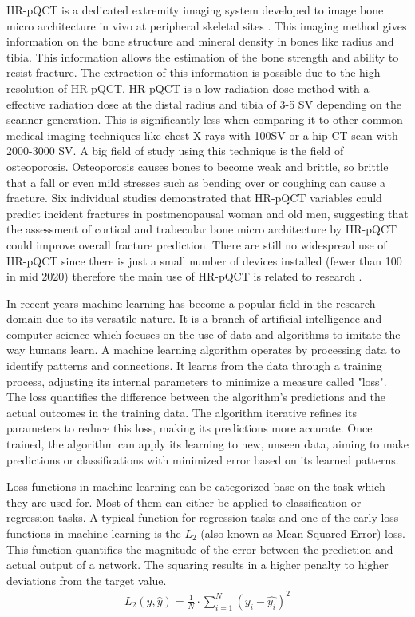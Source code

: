 \documentclass[
a4paper, 
12pt,
grayscalebody, %
abstract=on,
twoside, BCOR10mm, 12pt, DIV13,headinclude, footexclude, final, abstracton, openright
]{ibireprt}
\numberwithin{equation}{chapter}
\numberwithin{table}{chapter}
\numberwithin{figure}{chapter}
\numberwithin{algorithm}{chapter}
\numberwithin{example}{chapter}
\numberwithin{example}{chapter}
\begin{document}
HR-pQCT is a  dedicated extremity imaging system developed to image bone micro architecture in vivo at peripheral skeletal sites \cite{Bergh2021}. This imaging method gives information on the bone structure and mineral density in bones like radius and tibia. This information allows the estimation of the bone strength and ability to resist fracture. The extraction of this information is possible due to the high resolution of HR-pQCT.%
 HR-pQCT is a low radiation dose method with a effective radiation dose at the distal radius and tibia of  3-5 \textmu SV depending on the scanner  generation. This is significantly less when comparing it to other common medical imaging techniques like chest X-rays with 100\textmu SV or a hip CT scan with 2000-3000 \textmu SV. A big field of study using this technique is the field of osteoporosis. Osteoporosis causes bones to become weak and brittle, so brittle that a fall or even mild stresses such as bending over or coughing can cause a fracture. Six individual studies demonstrated that HR-pQCT variables could predict incident fractures in postmenopausal woman and old men, suggesting that the assessment of cortical and trabecular bone micro architecture by HR-pQCT could improve overall fracture prediction. There are still no widespread use of HR-pQCT since there is just a small number of devices installed (fewer than 100 in mid 2020) therefore the main use of HR-pQCT is related to research \cite{Bergh2021}.


In recent years machine learning has become a popular field in the research domain due to its versatile nature. It is a branch of artificial intelligence and computer science which focuses on the use of data and algorithms to imitate the way humans learn. A machine learning algorithm operates by processing data to identify patterns and connections. It learns from the data through a training process, adjusting its internal parameters to minimize a measure called "loss". The loss quantifies the difference between the algorithm's predictions and the actual outcomes in the training data. The algorithm iterative refines its parameters to reduce this loss, making its predictions more accurate. Once trained, the algorithm can apply its learning to new, unseen data, aiming to make predictions or classifications with minimized error based on its learned patterns.

Loss functions in machine learning can be categorized base on the task which they are used for. Most of them can either be applied to classification or regression tasks. A typical function for regression tasks and one of the early loss functions in machine learning is the $L_2$ (also known as Mean Squared Error) loss. This function quantifies the magnitude of the error between the prediction and actual output of a network. The squaring results in a higher penalty to higher deviations from the target value. 
\begin{align}
	L_2(y,\hat{y})=\frac{1}{N}\cdot \sum^{N}_{i=1}(y_i-\hat{y_i})^2
\end{align}
\end{document}
